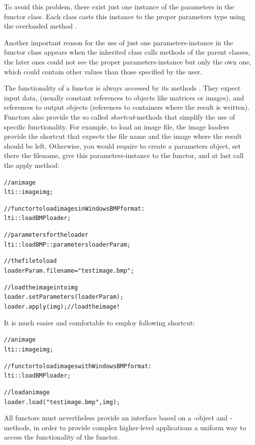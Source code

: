 To avoid this problem, there exist just one instance of the parameters in the
functor class.  Each class casts this instance to the proper parameters type
using the overloaded method .

Another important reason for the use of just one parameters-instance in the
functor class appears when the inherited class calls methods of the parent
classes, the later ones could not see the proper parameters-instance but only
the own one, which could contain other values than those specified by the
user.

The functionality of a functor is always accessed by its methods
.  They expect input data, (usually constant references to objects
like matrices or images), and references to output objects (references to
containers where the result is written).  Functors also provide the so
called \emph{shortcut}-methods that simplify the use of specific
functionality.  For example, to load an image file, the image loaders provide
the shortcut  that expects the file name and the image where the
result should be left.  Otherwise, you would require to create a parameters
object, set there the filename, give this parameters-instance to the functor,
and at last call the apply method:

{\small
\begin{alltt}
  // an image
  lti::image img;

  // functor to load images in Windows BMP format:
  lti::loadBMP loader;

  // parameters for the loader
  lti::loadBMP::parameters loaderParam;

  // the file to load
  loaderParam.filename = "testimage.bmp";

  // load the image into img
  loader.setParameters(loaderParam);
  loader.apply(img); // load the image!

\end{alltt}
}

It is much easier and comfortable to employ following shortcut:

{\small
\begin{alltt}
   // an image
  lti::image img;

  // functor to load images with Windows BMP format:
  lti::loadBMP loader;

  // load an image
  loader.load("testimage.bmp",img);
    
\end{alltt}
}

All functors must nevertheless provide an interface based on a
-object and -methods, in order to provide complex
higher-level applications a uniform way to access the functionality of the
functor.

